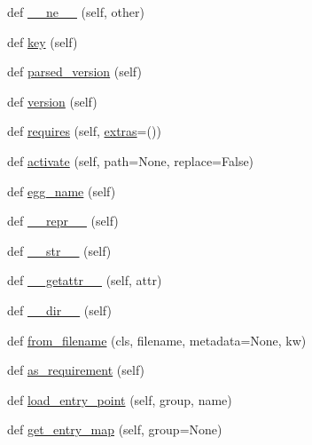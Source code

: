 \begin{DoxyCompactItemize}
\item 
def \hyperlink{classpkg__resources_1_1Distribution_a68a0e4b0dde33f9c9d229ab719bbc4bc}{\+\_\+\+\_\+ne\+\_\+\+\_\+} (self, other)
\item 
def \hyperlink{classpkg__resources_1_1Distribution_aed88aca83c5db4914ee52d4b3e63181d}{key} (self)
\item 
def \hyperlink{classpkg__resources_1_1Distribution_afe531c4633dee5ab0234fc2795381504}{parsed\+\_\+version} (self)
\item 
def \hyperlink{classpkg__resources_1_1Distribution_a454a1c3eae52dee89980a24d7c67f036}{version} (self)
\item 
def \hyperlink{classpkg__resources_1_1Distribution_ab33ded1c619d6d4cdbe69607d042daee}{requires} (self, \hyperlink{classpkg__resources_1_1Distribution_ae382387ed776b026046d59a56291b805}{extras}=())
\item 
def \hyperlink{classpkg__resources_1_1Distribution_a4c4474f066527ee18c2dc15af67911df}{activate} (self, path=None, replace=False)
\item 
def \hyperlink{classpkg__resources_1_1Distribution_a229d424f62d10b7e83bba3b3efe6dbbb}{egg\+\_\+name} (self)
\item 
def \hyperlink{classpkg__resources_1_1Distribution_ae60bb36b93f41b982e8b987aeee79b27}{\+\_\+\+\_\+repr\+\_\+\+\_\+} (self)
\item 
def \hyperlink{classpkg__resources_1_1Distribution_a3670256feca6287d7350751421d89697}{\+\_\+\+\_\+str\+\_\+\+\_\+} (self)
\item 
def \hyperlink{classpkg__resources_1_1Distribution_a60734974b4449119f97e844be57ba38f}{\+\_\+\+\_\+getattr\+\_\+\+\_\+} (self, attr)
\item 
def \hyperlink{classpkg__resources_1_1Distribution_a67087b4e3b38b54036245173353e44c4}{\+\_\+\+\_\+dir\+\_\+\+\_\+} (self)
\item 
def \hyperlink{classpkg__resources_1_1Distribution_a71ffec18d8ff265f81127ba179f5d9b7}{from\+\_\+filename} (cls, filename, metadata=None, kw)
\item 
def \hyperlink{classpkg__resources_1_1Distribution_a2c549b93626be28f83a4bc1734821c2b}{as\+\_\+requirement} (self)
\item 
def \hyperlink{classpkg__resources_1_1Distribution_a2a3097439745646ac5be811f39c2aca8}{load\+\_\+entry\+\_\+point} (self, group, name)
\item 
def \hyperlink{classpkg__resources_1_1Distribution_a62bf46d7615519b2b455498257f9d536}{get\+\_\+entry\+\_\+map} (self, group=None)
\item 

\end{DoxyCompactItemize}
